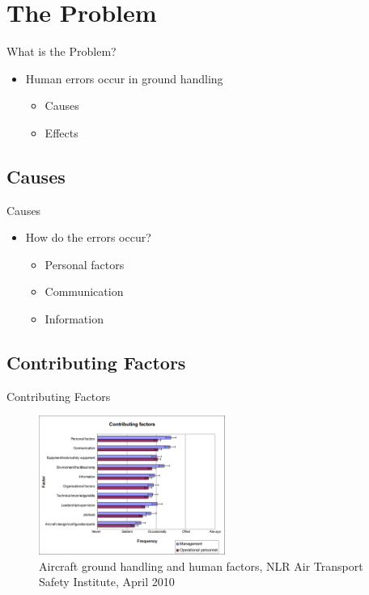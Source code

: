\section{The Problem} 
\begin{frame}{What is the Problem?}
	\begin{itemize}
		\item{Human errors occur in ground handling}
		\begin{itemize}
			\item Causes
			\item Effects
		\end{itemize}
	\end{itemize}
\end{frame}

\subsection{Causes}
\begin{frame}{Causes}
	\begin{itemize}
		\item{How do the errors occur?}
		\begin{itemize}
			\item Personal factors
			\item Communication
			\item Information
		\end{itemize}
	\end{itemize}
\end{frame}

\subsection{Contributing Factors}
\begin{frame}{Contributing Factors}
		\begin{figure}[H]
			\centering
			\includegraphics[width=230px]{Grafik/ContributingFactors}
			\caption{\footnotesize Aircraft ground handling and human factors, NLR Air Transport Safety Institute, April 2010}
		\end{figure}
\end{frame}

